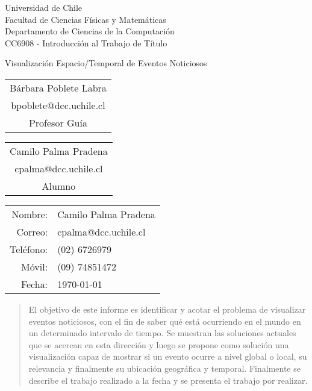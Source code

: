 \documentclass[10pt]{article}
\begin{document}
	\thispagestyle{empty}
	\begin{minipage}{\textwidth}
		Universidad de Chile\\
		Facultad de Ciencias Físicas y Matemáticas\\
		Departamento de Ciencias de la Computación\\
		CC6908 - Introducción al Trabajo de Título
	\end{minipage}
	\vfill
	\begin{minipage}{\textwidth}
		\begin{center}
			\huge{Visualización Espacio/Temporal de Eventos Noticiosos}
		\end{center}
	\end{minipage}
	\vfill
	
	\begin{minipage}{\textwidth}
		\begin{tabular}{c}
			\hline
			Bárbara Poblete Labra\\
			bpoblete@dcc.uchile.cl\\
			Profesor Guía
		\end{tabular}
		\hfill
		\begin{tabular}{c}
			\hline
			Camilo Palma Pradena\\
			cpalma@dcc.uchile.cl\\
			Alumno
		\end{tabular}
		\vspace{1cm}
	\end{minipage}
	\begin{minipage}{\textwidth}
		\null
		\hfill
		\begin{minipage}{2in}
			\begin{tabular}{rl}
				Nombre:&Camilo Palma Pradena\\
				Correo:&cpalma@dcc.uchile.cl\\
				Teléfono:&(02) 6726979\\
				Móvil:&(09) 74851472\\
				Fecha:&\today
			\end{tabular}
		\end{minipage}
	\end{minipage}

	\newpage

\begin{abstract}
	El objetivo de este informe es identificar y acotar el problema de visualizar eventos noticiosos, con el fin de saber qué está ocurriendo en el mundo en un determinado intervalo de tiempo. Se muestran las soluciones actuales que se acercan en esta dirección y luego se propone como solución una visualización capaz de mostrar si un evento ocurre a nivel global o local, su relevancia y finalmente su ubicación geográfica y temporal. Finalmente se describe el trabajo realizado a la fecha y se presenta el trabajo por realizar.
\end{abstract}
\end{document}

